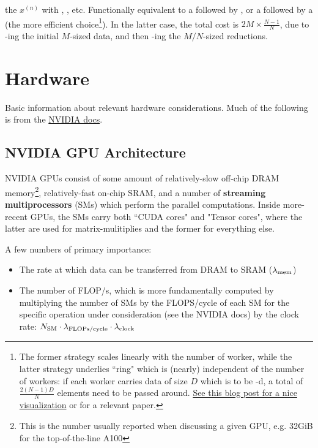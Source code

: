 \documentclass[11pt]{article}
\begin{document}
\begin{itemize}
	      the $ x ^{ (n) } $ with , , etc. Functionally equivalent to a
	       followed by , or a  followed
	      by a  (the more efficient choice\footnote{The former strategy scales
		      linearly with the number of worker, while the latter strategy underlies ``ring"
		       which is (nearly) independent of the number of workers: if each
		      worker carries data of size $ D $ which is to be -d, a total of $
			      \frac{ 2 \left ( N-1 \right )D }{ N } $ elements need to be passed around.
		      \href{https://andrew.gibiansky.com/blog/machine-learning/baidu-allreduce/}{See this blog
			      post for a nice visualization} or \cite{bandwidthOptimalAllReduce2009} for a relevant
              paper.\label{foot_all_reduce}}). In the latter case, the total cost is $ 2M \times
              \frac{ N-1 }{ N } $, due to -ing the initial $ M $-sized data, and
              then -ing the $ M/N $-sized reductions.
\end{itemize}



\section{Hardware}

Basic information about relevant hardware considerations. Much of the following is from the
\href{https://docs.nvidia.com/deeplearning/performance/dl-performance-gpu-background/index.html}{NVIDIA
	docs}.



\subsection{NVIDIA GPU Architecture}

NVIDIA GPUs consist of some amount of relatively-slow off-chip DRAM memory\footnote{This is the number usually reported when
	discussing a given GPU, e.g. 32GiB for the top-of-the-line A100}, relatively-fast on-chip SRAM, and
a number of \textbf{streaming multiprocessors} (SMs) which perform the parallel computations.  Inside
more-recent GPUs, the SMs carry both ``CUDA cores" and "Tensor cores", where the latter are used for matrix-mulitiplies
and the former for everything else.


A few numbers of primary importance:
\begin{itemize}
	\item The rate at which data can be transferred from DRAM to SRAM ($ \lambda _{ {\rm mem} } $)
	\item The number of FLOP/s, which is more fundamentally computed by multiplying the number of
	      SMs by the FLOPS/cycle of each SM for the specific operation under consideration (see the NVIDIA
	      docs) by the clock rate: $ N _{ {\rm SM} }\cdot  \lambda _{ {\rm FLOPs/cycle} }\cdot  \lambda _{
			      {\rm clock} } $
\end{itemize}
\end{document}
